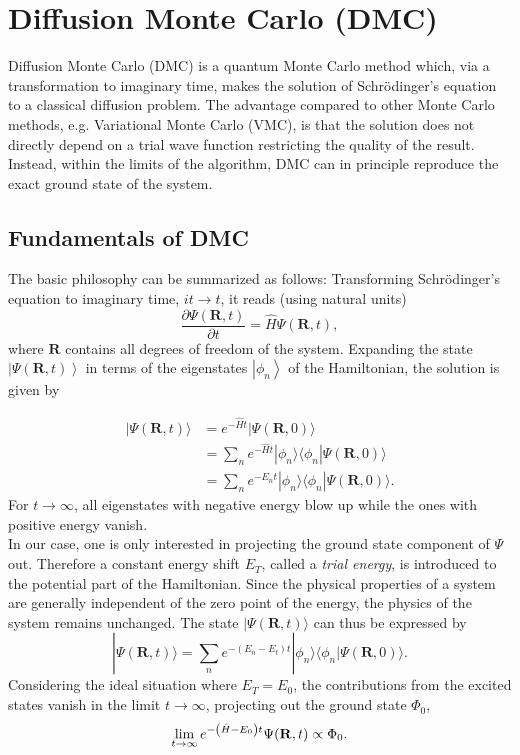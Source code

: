 \section{Diffusion Monte Carlo (DMC)}
\label{sec:DMC0}
Diffusion Monte Carlo (DMC) is a quantum Monte Carlo method which, via a transformation to imaginary time, makes the solution of  Schr\"odinger's equation to a classical diffusion problem. The advantage compared to other Monte Carlo methods, e.g. Variational Monte Carlo (VMC), is that the solution does not directly depend on a trial wave function restricting the quality of the result. Instead, within the limits of the algorithm, DMC can in principle reproduce the exact ground state of the system.

\subsection{Fundamentals of DMC}

The basic philosophy can be summarized as follows: Transforming Schr\"odinger's equation to imaginary time, $it \rightarrow t$, it reads (using natural units)
\[
\frac{\partial \Psi\left(\mathbf{R}, t \right)}{\partial t} = \hat{H} \Psi\left(\mathbf{R}, t \right),
\]
where $\mathbf{R}$ contains all degrees of freedom of the system. Expanding the state $\left|\Psi(\mathbf{R}, t )\right\rangle$ in terms of the eigenstates $\left|\phi_n\right\rangle$ of the Hamiltonian, the solution is given by

\begin{align*}
|\Psi(\mathbf{R},t)\rangle &= e^{-\hat{H}t} |\Psi(\mathbf{R},0)\rangle \\
&= \sum\limits_n  e^{-\hat{H}t} |\phi_n\rangle \langle \phi_n  |\Psi(\mathbf{R},0)\rangle \\
&= \sum\limits_n  e^{-E_n t} |\phi_n\rangle \langle \phi_n  |\Psi(\mathbf{R},0)\rangle.
\end{align*}
For $t \rightarrow \infty$, all eigenstates with negative energy blow up while the ones with positive energy vanish.\\
In our case, one is only interested in projecting the ground state component of $\Psi$ out.
Therefore a constant energy shift $E_T$, called a \textit{trial energy}, is introduced to the potential part of the Hamiltonian. Since the physical properties of a system are generally independent of the zero point of the energy, the physics of the system remains unchanged. The state $ |\Psi(\mathbf{R},t)\rangle$ can thus be expressed by
\begin{equation}
|\Psi(\mathbf{R},t)\rangle = \sum\limits_n  e^{-(E_n- E_t) t} |\phi_n\rangle \langle \phi_n|\Psi(\mathbf{R},0)\rangle.
\label{eq:psi_DMC}
\end{equation}
Considering the ideal situation where $E_T = E_0$, the contributions from the excited states vanish in the limit $t \rightarrow \infty$, projecting out the ground state $\Phi_0$,
\[
\lim_{t \rightarrow \infty} e^{-\left(\hat{H}-E_0\right) t}\Psi(\mathbf{R},t) \propto \Phi_0.
\]

